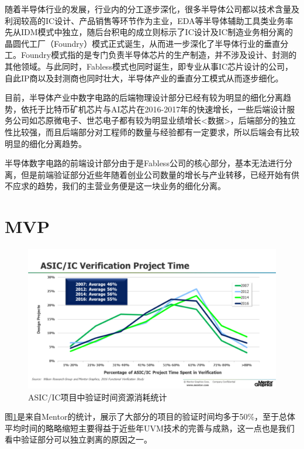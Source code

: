 \documentclass[a4paper,11pt]{article}
\begin{document}
随着半导体行业的发展，行业内的分工逐步深化，很多半导体公司都以技术含量及利润较高的IC设计、产品销售等环节作为主业，EDA等半导体辅助工具类业务率先从IDM模式中独立，随后台积电的成立则标示了IC设计及IC制造业务相分离的晶圆代工厂（Foundry）模式正式诞生，从而进一步深化了半导体行业的垂直分工。Foundry模式指的是专门负责半导体芯片的生产制造，并不涉及设计、封测的其他领域。与此同时，Fabless模式也同时诞生，即专业从事IC芯片设计的公司，自此IP商以及封测商也同时壮大，半导体产业的垂直分工模式从而逐步细化。

目前，半导体产业中数字电路的后端物理设计部分已经有较为明显的细化分离趋势，依托于比特币矿机芯片与AI芯片在2016-2017年的快速增长，一些后端设计服务公司如芯原微电子、世芯电子都有较为明显业绩增长<数据>，后端部分的独立性比较强，而且后端部分对工程师的数量与经验都有一定要求，所以后端会有比较明显的细化分离趋势。

半导体数字电路的前端设计部分由于是Fabless公司的核心部分，基本无法进行分离，但是前端验证部分近些年随着创业公司数量的增长与产业转移，已经开始有供不应求的趋势，我们的主营业务便是这一块业务的细化分离。

\section{MVP}
\begin{figure}[ht]
  \centering
  \includegraphics[width=0.8\linewidth]{images/wilson1.png}
  \caption{ASIC/IC项目中验证时间资源消耗统计}
  \label{fig:wilson_1}
\end{figure}

图\ref{fig:wilson_1}是来自Mentor的统计，展示了大部分的项目的验证时间均多于50\%，至于总体平均时间的略略缩短主要得益于近些年UVM技术的完善与成熟，这一点也是我们看中验证部分可以独立剥离的原因之一。
\end{document}

